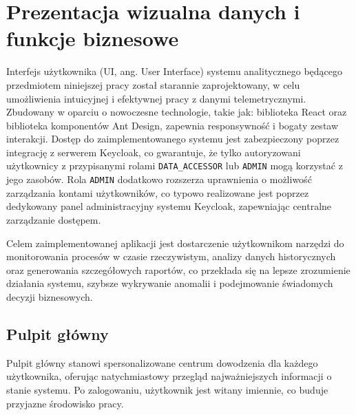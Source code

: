 \section{Prezentacja wizualna danych i funkcje biznesowe}
\label{chap:prezentacja_wizualna}

Interfejs użytkownika (UI, ang. User Interface) systemu analitycznego będącego przedmiotem niniejszej pracy został starannie zaprojektowany, w celu umożliwienia intuicyjnej i efektywnej pracy z danymi telemetrycznymi. Zbudowany w oparciu o nowoczesne technologie, takie jak: biblioteka React oraz biblioteka komponentów Ant Design, zapewnia responsywność i bogaty zestaw interakcji. Dostęp do zaimplementowanego systemu jest zabezpieczony poprzez integrację z serwerem Keycloak, co gwarantuje, że tylko autoryzowani użytkownicy z przypisanymi rolami \texttt{DATA\_ACCESSOR} lub \texttt{ADMIN} mogą korzystać z jego zasobów. Rola \texttt{ADMIN} dodatkowo rozszerza uprawnienia o możliwość zarządzania kontami użytkowników, co typowo realizowane jest poprzez dedykowany panel administracyjny systemu Keycloak, zapewniając centralne zarządzanie dostępem.

Celem zaimplementowanej aplikacji jest dostarczenie użytkownikom narzędzi do monitorowania procesów w czasie rzeczywistym, analizy danych historycznych oraz generowania szczegółowych raportów, co przekłada się na lepsze zrozumienie działania systemu, szybsze wykrywanie anomalii i podejmowanie świadomych decyzji biznesowych.

\subsection{Pulpit główny}

Pulpit główny stanowi spersonalizowane centrum dowodzenia dla każdego użytkownika, oferując natychmiastowy przegląd najważniejszych informacji o stanie systemu. Po zalogowaniu, użytkownik jest witany imiennie, co buduje przyjazne środowisko pracy.


